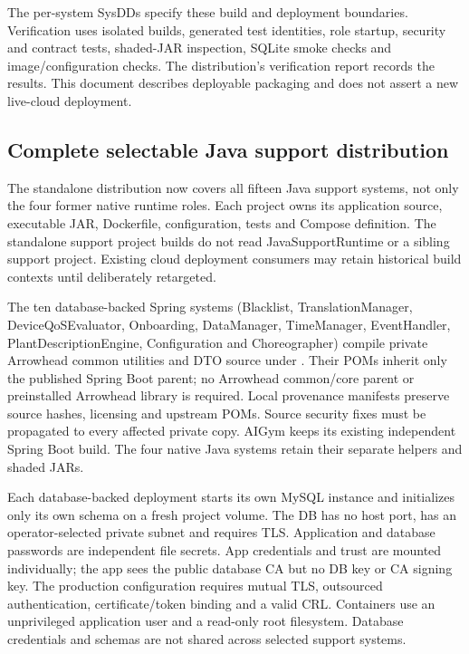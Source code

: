 \documentclass[a4paper]{arrowhead}
\begin{document}
The per-system SysDDs specify these build and deployment boundaries. Verification uses isolated builds, generated test identities, role startup, security and contract tests, shaded-JAR inspection, SQLite smoke checks and image/configuration checks. The distribution's verification report records the results. This document describes deployable packaging and does not assert a new live-cloud deployment.

\subsection{Complete selectable Java support distribution}
The standalone distribution now covers all fifteen Java support systems, not only the four former native runtime roles. Each project owns its application source, executable JAR, Dockerfile, configuration, tests and Compose definition. The standalone support project builds do not read JavaSupportRuntime or a sibling support project. Existing cloud deployment consumers may retain historical build contexts until deliberately retargeted.

The ten database-backed Spring systems (Blacklist, TranslationManager, DeviceQoSEvaluator, Onboarding, DataManager, TimeManager, EventHandler, PlantDescriptionEngine, Configuration and Choreographer) compile private Arrowhead common utilities and DTO source under . Their POMs inherit only the published Spring Boot parent; no Arrowhead common/core parent or preinstalled Arrowhead library is required. Local provenance manifests preserve source hashes, licensing and upstream POMs. Source security fixes must be propagated to every affected private copy. AIGym keeps its existing independent Spring Boot build. The four native Java systems retain their separate helpers and shaded JARs.

Each database-backed deployment starts its own MySQL instance and initializes only its own schema on a fresh project volume. The DB has no host port, has an operator-selected private subnet and requires TLS. Application and database passwords are independent file secrets. App credentials and trust are mounted individually; the app sees the public database CA but no DB key or CA signing key. The production configuration requires mutual TLS, outsourced authentication, certificate/token binding and a valid CRL. Containers use an unprivileged application user and a read-only root filesystem. Database credentials and schemas are not shared across selected support systems.
\end{document}
